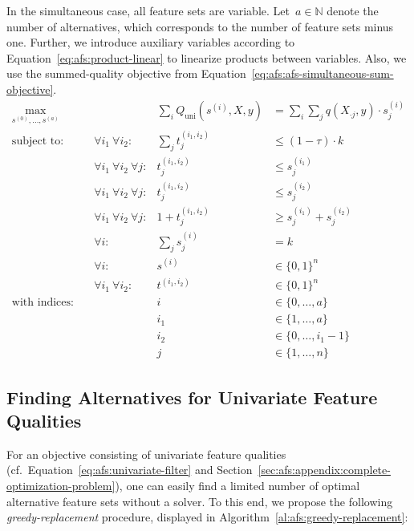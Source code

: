 \documentclass{article}
\theoremstyle{definition}
\begin{document}
In the simultaneous case, all feature sets are variable.
Let~$a \in \mathbb{N}$ denote the number of alternatives, which corresponds to the number of feature sets minus one.
Further, we introduce auxiliary variables according to Equation~\ref{eq:afs:product-linear} to linearize products between variables.
Also, we use the summed-quality objective from Equation~\ref{eq:afs:afs-simultaneous-sum-objective}.
%
\begin{equation}
	\begin{aligned}
		\max_{s^{(0)}, \dots, s^{(a)}} &\quad & \sum_i Q_{\text{uni}}(s^{(i)},X,y) &= \sum_i \sum_j q(X_{\cdot{}j},y) \cdot s^{(i)}_j\\
		\text{subject to:} &\quad \forall i_1~\forall i_2: & \sum_j t^{(i_1,i_2)}_j &\leq (1 - \tau) \cdot k \\
		&\quad \forall i_1~\forall i_2~\forall j: & t^{(i_1,i_2)}_j &\leq s^{(i_1)}_j \\
		&\quad \forall i_1~\forall i_2~\forall j: & t^{(i_1,i_2)}_j &\leq s^{(i_2)}_j \\
		&\quad \forall i_1~\forall i_2~\forall j: & 1 + t^{(i_1,i_2)}_j &\geq s^{(i_1)}_j + s^{(i_2)}_j \\
		&\quad \forall i: & \sum_j s^{(i)}_j &= k \\
		&\quad \forall i: & s^{(i)} &\in \{0,1\}^n \\
		&\quad \forall i_1~\forall i_2: & t^{(i_1,i_2)} &\in \{0,1\}^n \\
		\text{with indices:} &\quad & i &\in \{0, \dots, a\} \\
		&\quad & i_1 &\in \{1, \dots, a\} \\
		&\quad & i_2 &\in \{0, \dots, i_1-1\} \\
		&\quad & j &\in \{1, \dots, n\}
	\end{aligned}
	\label{eq:afs:afs-simultaneous-complete}
\end{equation}

\subsection{Finding Alternatives for Univariate Feature Qualities}
\label{sec:afs:appendix:univariate-search-algorithm}

For an objective consisting of univariate feature qualities (cf.~Equation~\ref{eq:afs:univariate-filter} and Section~\ref{sec:afs:appendix:complete-optimization-problem}), one can easily find a limited number of optimal alternative feature sets without a solver.
To this end, we propose the following \emph{greedy-replacement} procedure, displayed in Algorithm~\ref{al:afs:greedy-replacement}:
\end{document}
